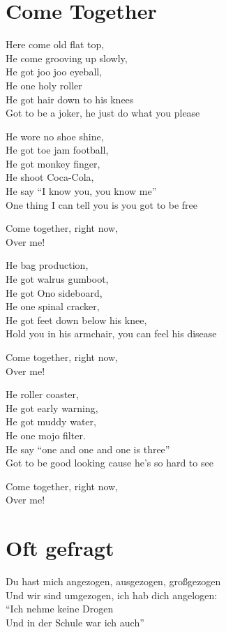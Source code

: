 \documentclass[]{book}
\begin{document}
\hypertarget{come-together}{%
\section{Come Together}\label{come-together}}

Here come old flat top,\\
He come grooving up slowly,\\
He got joo joo eyeball,\\
He one holy roller\\
He got hair down to his knees\\
Got to be a joker, he just do what you please

He wore no shoe shine,\\
He got toe jam football,\\
He got monkey finger,\\
He shoot Coca-Cola,\\
He say ``I know you, you know me''\\
One thing I can tell you is you got to be free

Come together, right now,\\
Over me!

He bag production,\\
He got walrus gumboot,\\
He got Ono sideboard,\\
He one spinal cracker,\\
He got feet down below his knee,\\
Hold you in his armchair, you can feel his disease

Come together, right now,\\
Over me!

He roller coaster,\\
He got early warning,\\
He got muddy water,\\
He one mojo filter.\\
He say ``one and one and one is three''\\
Got to be good looking cause he's so hard to see

Come together, right now,\\
Over me!

\hypertarget{oft-gefragt-1}{%
\section{Oft gefragt}\label{oft-gefragt-1}}

Du hast mich angezogen, ausgezogen, großgezogen\\
Und wir sind umgezogen, ich hab dich angelogen:\\
``Ich nehme keine Drogen\\
Und in der Schule war ich auch''
\end{document}
